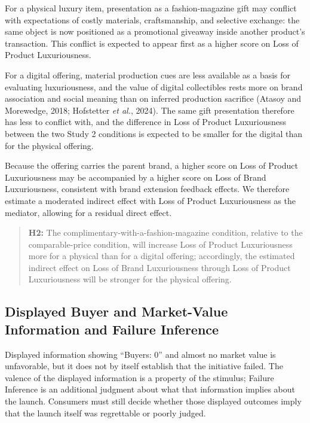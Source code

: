 \documentclass[12pt, a4paper]{article}
\begin{document}
For a physical luxury item, presentation as a fashion-magazine gift may conflict with expectations of costly materials, craftsmanship, and selective exchange: the same object is now positioned as a promotional giveaway inside another product's transaction. This conflict is expected to appear first as a higher score on Loss of Product Luxuriousness.

For a digital offering, material production cues are less available as a basis for evaluating luxuriousness, and the value of digital collectibles rests more on brand association and social meaning than on inferred production sacrifice (Atasoy and Morewedge, 2018; Hofstetter \emph{et al.}, 2024). The same gift presentation therefore has less to conflict with, and the difference in Loss of Product Luxuriousness between the two Study 2 conditions is expected to be smaller for the digital than for the physical offering.

Because the offering carries the parent brand, a higher score on Loss of Product Luxuriousness may be accompanied by a higher score on Loss of Brand Luxuriousness, consistent with brand extension feedback effects. We therefore estimate a moderated indirect effect with Loss of Product Luxuriousness as the mediator, allowing for a residual direct effect.

\begin{quote}
\textbf{H2:} The complimentary-with-a-fashion-magazine condition, relative to the comparable-price condition, will increase Loss of Product Luxuriousness more for a physical than for a digital offering; accordingly, the estimated indirect effect on Loss of Brand Luxuriousness through Loss of Product Luxuriousness will be stronger for the physical offering.
\end{quote}

\subsection{Displayed Buyer and Market-Value Information and Failure Inference}

Displayed information showing ``Buyers: 0'' and almost no market value is unfavorable, but it does not by itself establish that the initiative failed. The valence of the displayed information is a property of the stimulus; Failure Inference is an additional judgment about what that information implies about the launch. Consumers must still decide whether those displayed outcomes imply that the launch itself was regrettable or poorly judged.
\end{document}

